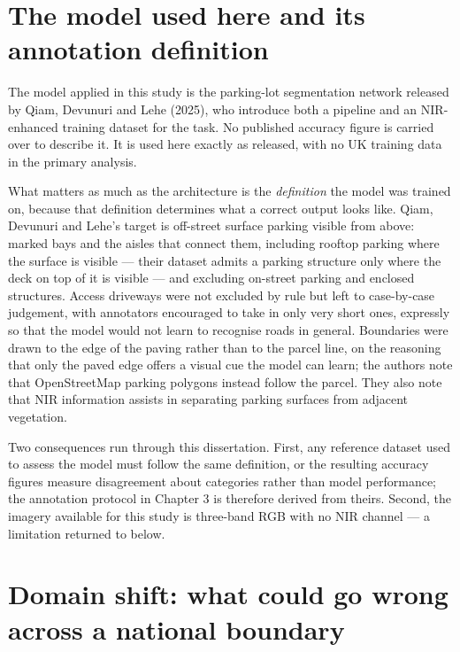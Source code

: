 \hypertarget{the-model-used-here-and-its-annotation-definition}{%
\section{The model used here and its annotation definition}\label{the-model-used-here-and-its-annotation-definition}}

The model applied in this study is the parking-lot segmentation network released by Qiam, Devunuri and Lehe (2025), who introduce both a pipeline and an NIR-enhanced training dataset for the task. No published accuracy figure is carried over to describe it. It is used here exactly as released, with no UK training data in the primary analysis.

What matters as much as the architecture is the \emph{definition} the model was trained on, because that definition determines what a correct output looks like. Qiam, Devunuri and Lehe's target is off-street surface parking visible from above: marked bays and the aisles that connect them, including rooftop parking where the surface is visible --- their dataset admits a parking structure only where the deck on top of it is visible --- and excluding on-street parking and enclosed structures. Access driveways were not excluded by rule but left to case-by-case judgement, with annotators encouraged to take in only very short ones, expressly so that the model would not learn to recognise roads in general. Boundaries were drawn to the edge of the paving rather than to the parcel line, on the reasoning that only the paved edge offers a visual cue the model can learn; the authors note that OpenStreetMap parking polygons instead follow the parcel. They also note that NIR information assists in
separating parking surfaces from adjacent vegetation.

Two consequences run through this dissertation. First, any reference dataset used to assess the model must follow the same definition, or the resulting accuracy figures measure disagreement about categories rather than model performance; the annotation protocol in Chapter 3 is therefore derived from theirs. Second, the imagery available for this study is three-band RGB with no NIR channel --- a limitation returned to below.

\hypertarget{domain-shift-what-could-go-wrong-across-a-national-boundary}{%
\section{Domain shift: what could go wrong across a national boundary}\label{domain-shift-what-could-go-wrong-across-a-national-boundary}}

